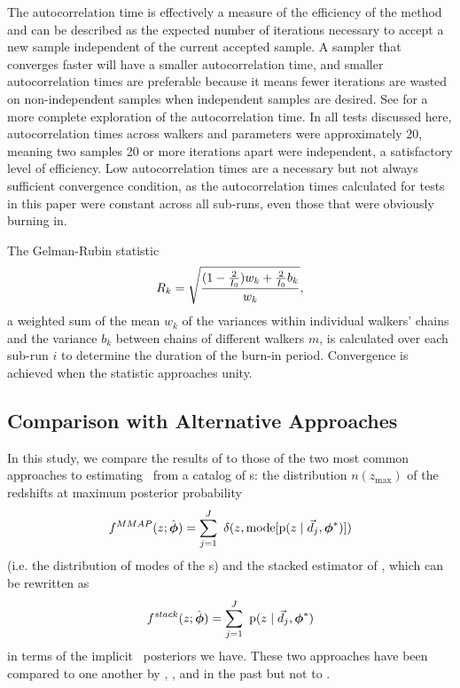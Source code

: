 The autocorrelation time is effectively a measure of the efficiency of the method and can be described as the expected number of iterations necessary to accept a new sample independent of the current accepted sample.  
A sampler that converges faster will have a smaller autocorrelation time, and smaller autocorrelation times are preferable because it means fewer iterations are wasted on non-independent samples when independent samples are desired.  
See \citet{Foreman-Mackey2013} for a more complete exploration of the autocorrelation time.  
In all tests discussed here, autocorrelation times across walkers and parameters were approximately 20, meaning two samples 20 or more iterations apart were independent, a satisfactory level of efficiency.  
Low autocorrelation times are a necessary but not always sufficient convergence condition, as the autocorrelation times calculated for tests in this paper were constant across all sub-runs, even those that were obviously burning in.  

The Gelman-Rubin statistic
\begin{equation}
\eqlabel{eq:gr}
R_{k} = \sqrt{\frac{(1 - \frac{2}{I_{0}}) w_{k} + \frac{2}{I_{0}} b_{k}}{w_{k}}},
\end{equation}
a weighted sum of the mean $w_{k}$ of the variances within individual walkers' chains and the variance $b_{k}$ between chains of different walkers $m$, is calculated over each sub-run $i$ to determine the duration of the burn-in period.  
Convergence is achieved when the statistic approaches unity.  

\subsection{Comparison with Alternative Approaches}

In this study, we compare the results of  to those of the two most common approaches to estimating \nz\ from a catalog of \pzpdf s: the distribution $n(z_{\mathrm{max}})$ of the redshifts at maximum posterior probability
\begin{equation}
\eqlabel{eq:mmap}
f^{MMAP}(z; \hat{\ndphi}) = \sum_{j=1}^{J}\ \delta(z, \mathrm{mode}[\pr{z \gvn \data_{j}, \ndphi^{*}}])
\end{equation}
(i.e. the distribution of modes of the \pzpdf s) and the stacked estimator of , which can be rewritten as 
\begin{equation}
\eqlabel{eq:stack}
f^{stack}(z; \hat{\ndphi}) = \sum_{j=1}^{J}\ \pr{z \gvn \data_{j}, \ndphi^{*}}
\end{equation}
in terms of the implicit \pz\ posteriors we have.
These two approaches have been compared to one another by \citet{Hildebrandt2012}, \citet{Benjamin2013}, and \citet{Asorey2016} in the past but not to \Chippr.

